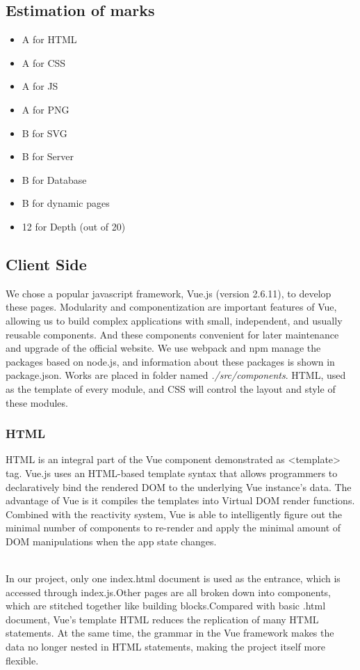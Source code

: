\documentclass{article}
\begin{document}
\subsection{Estimation of marks}
\begin{itemize}
    \item A for HTML
    \item A for CSS
    \item A for JS
    \item A for PNG
    \item B for SVG
    \item B for Server
    \item B for Database
    \item B for dynamic pages
    \item 12 for Depth (out of 20)
\end{itemize} 

\subsection{Client Side}
We chose a popular javascript framework, Vue.js (version 2.6.11), to 
develop these pages.
Modularity and componentization are important features of Vue,  
allowing us to build complex applications with small, independent, 
and usually reusable components. And these components convenient 
for later maintenance and upgrade of the official website. 
We use webpack and npm manage the packages based on node.js, and 
information about these packages is shown in package.json. Works are 
placed in folder named \textit{./src/components}. HTML, used as 
the template of every module, and CSS will control the layout 
and style of these modules.

\subsubsection{HTML}
HTML is an integral part of the Vue component demonstrated as \textless template\textgreater \space
tag. 
Vue.js uses an HTML-based template syntax that allows programmers to declaratively 
bind the rendered DOM to the underlying Vue instance’s data. The advantage of Vue 
is it compiles the templates into Virtual DOM render functions. Combined with the 
reactivity system, Vue is able to intelligently figure out the minimal number of 
components to re-render and apply the minimal amount of DOM manipulations when the 
app state changes.

~\\
\noindent
In our project, only one index.html document is used as the entrance, which is 
accessed through index.js.Other pages are all broken down into components, 
which are stitched together like building blocks.Compared with basic .html 
document, Vue's template HTML reduces the replication of many HTML statements. 
At the same time, the grammar in the Vue framework makes the data no longer 
nested in HTML statements, making the project itself more flexible.
\end{document}
